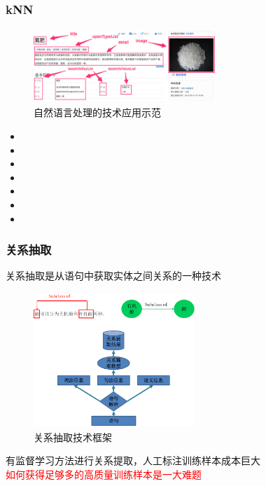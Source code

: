 \begin{frame}
	\frametitle{\textrm{kNN}}
\begin{figure}[h!]
\centering
\vskip -8pt
\includegraphics[height=1.10in,width=2.70in,viewport=0 0 150 60,clip]{Figures/KG_Chem-Nitro_fertilizer.png}
\caption{\tiny 自然语言处理的技术应用示范}%
\label{Fig:KG_Chem-Nitro_fertilizer}
\end{figure}
\begin{itemize}
	\item {\fontsize{7.2pt}{6.2pt}}
	\item {\fontsize{7.2pt}{6.2pt}}
	\item {\fontsize{7.2pt}{6.2pt}}
	\item {\fontsize{7.2pt}{6.2pt}}
	\item {\fontsize{7.2pt}{6.2pt}}
	\item {\fontsize{7.2pt}{6.2pt}\selectfont{各项指标进行标准化，使其都服从均值为$0$，方差为$1$的分布}}
	\item {\fontsize{7.2pt}{6.2pt}\selectfont{各项指标进行加权求和，权值通过交叉验证$+$网格搜索求得}}
\end{itemize}
\end{frame}

\begin{frame}
	\frametitle{关系抽取}
	关系抽取是从语句中获取实体之间关系的一种技术
\begin{figure}[h!]
\centering
\vskip -8pt
\includegraphics[height=2.00in,width=2.40in,viewport=0 0 200 170,clip]{Figures/KG_Chem-Relation_extract.png}
\caption{\tiny 关系抽取技术框架}%
\label{Fig:KG_Chem-Relation_extract}
\end{figure}
有监督学习方法进行关系提取，人工标注训练样本成本巨大\\\textcolor{red}{如何获得足够多的高质量训练样本是一大难题}
\end{frame}


